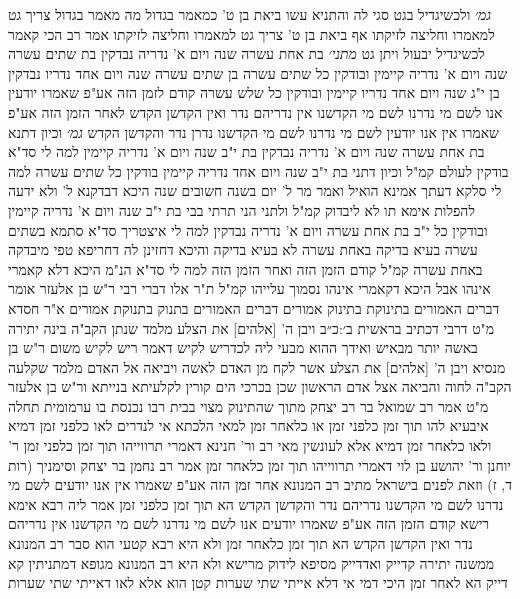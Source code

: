 \documentclass[12pt, openany]{book}
\begin{document}
{{\large\emph{גמ׳}} ולכשיגדיל בגט סגי לה והתניא  עשו ביאת בן ט' כמאמר בגדול
מה מאמר בגדול צריך גט למאמרו וחליצה לזיקתו אף ביאת בן ט' צריך גט למאמרו וחליצה לזיקתו 
אמר רב הכי קאמר
לכשיגדיל יבעול ויתן גט
{\large\emph{מתני׳}} בת אחת עשרה שנה ויום א' נדריה נבדקין בת שתים עשרה שנה ויום א' נדריה קיימין ובודקין כל שתים עשרה
בן שתים עשרה שנה ויום אחד נדריו נבדקין בן י"ג שנה ויום אחד נדריו קיימין ובודקין כל שלש עשרה 
קודם לזמן הזה אע"פ שאמרו יודעין אנו לשם מי נדרנו לשם מי הקדשנו אין נדריהם נדר ואין הקדשן הקדש  לאחר הזמן הזה אע"פ שאמרו אין אנו יודעין לשם מי נדרנו לשם מי הקדשנו נדרן נדר והקדשן הקדש
{\large\emph{גמ׳}} וכיון דתנא בת אחת עשרה שנה ויום א' נדריה נבדקין בת י"ב שנה ויום א' נדריה קיימין למה לי סד"א  בודקין לעולם קמ"ל 
וכיון דתני בת י"ב שנה ויום אחד נדריה קיימין בודקין כל שתים עשרה למה לי  סלקא דעתך אמינא  הואיל ואמר מר ל' יום בשנה חשובים שנה היכא דבדקנא ל' ולא ידעה להפלות אימא  תו לא ליבדוק קמ"ל 
ולתני הני תרתי בבי  בת י"ב שנה ויום א' נדריה קיימין ובודקין כל י"ב בת אחת עשרה ויום א' נדריה נבדקין למה לי 
איצטריך סד"א  סתמא בשתים עשרה בעיא בדיקה באחת עשרה לא בעיא בדיקה  והיכא דחזינן לה דחריפא טפי מיבדקה באחת עשרה קמ"ל 
קודם הזמן הזה ואחר הזמן הזה למה לי  סד"א  הנ"מ היכא דלא קאמרי אינהו אבל היכא דקאמרי אינהו נסמוך עלייהו קמ"ל 
ת"ר אלו דברי רבי  ר"ש בן אלעזר אומר  דברים האמורים בתינוקת בתינוק אמורים דברים האמורים בתנוק בתנוקת אמורים 
א"ר חסדא  מ"ט דרבי דכתיב {בראשית ב׳:כ״ב } ויבן ה' [אלהים] את הצלע מלמד שנתן הקב"ה בינה יתירה באשה יותר מבאיש 
ואידך ההוא מבעי ליה לכדריש לקיש דאמר ריש לקיש משום ר"ש בן מנסיא  ויבן ה' [אלהים] את הצלע אשר לקח מן האדם לאשה ויביאה אל האדם מלמד שקלעה הקב"ה לחוה והביאה אצל אדם הראשון שכן בכרכי הים קורין לקלעיתא בנייתא 
ור"ש בן אלעזר מ"ט  אמר רב שמואל בר רב יצחק  מתוך שהתינוק מצוי בבית רבו נכנסת בו ערמומית תחלה 
איבעיא להו  תוך זמן כלפני זמן או כלאחר זמן 
למאי הלכתא  אי לנדרים לאו כלפני זמן דמיא ולאו כלאחר זמן דמיא
אלא לעונשין מאי  רב ור' חנינא דאמרי תרווייהו  תוך זמן כלפני זמן ר' יוחנן ור' יהושע בן לוי דאמרי תרווייהו  תוך זמן כלאחר זמן 
אמר רב נחמן בר יצחק וסימניך  (רות ד, ז) וזאת לפנים בישראל 
מתיב רב המנונא  אחר זמן הזה אע"פ שאמרו אין אנו יודעים לשם מי נדרנו לשם מי הקדשנו נדריהם נדר והקדשן הקדש הא תוך זמן כלפני זמן 
אמר ליה רבא  אימא רישא קודם הזמן הזה אע"פ שאמרו יודעים אנו לשם מי נדרנו לשם מי הקדשנו אין נדריהם נדר ואין הקדשן הקדש הא תוך זמן כלאחר זמן 
ולא היא רבא קטעי  הוא סבר  רב המנונא ממשנה יתירה קדייק ואדדייק מסיפא לידוק מרישא 
ולא היא רב המנונא מגופא דמתניתין קא דייק הא לאחר זמן היכי דמי  אי דלא אייתי שתי שערות קטן הוא אלא לאו דאייתי שתי שערות}
\end{document}
